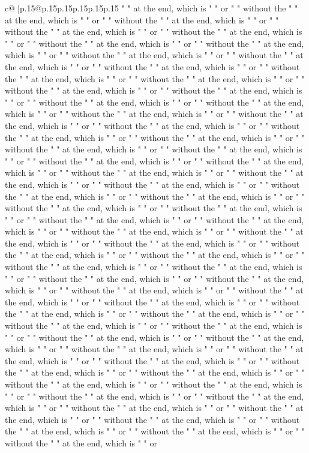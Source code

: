 \documentclass{article}
\begin{document}
{\begin{supertabular}{c@{$\;$}|p{.15\linewidth}@{}p{.15\linewidth}p{.15\linewidth}p{.15\linewidth}p{.15\linewidth}p{.15\linewidth}}
{{{" " at the end, which is " " or " " without the " " at the end, which is " " or " " without the " " at the end, which is " " or " " without the " " at the end, which is " " or " " without the " " at the end, which is " " or " " without the " " at the end, which is " " or " " without the " " at the end, which is " " or " " without the " " at the end, which is " " or " " without the " " at the end, which is " " or " " without the " " at the end, which is " " or " " without the " " at the end, which is " " or " " without the " " at the end, which is " " or " " without the " " at the end, which is " " or " " without the " " at the end, which is " " or " " without the " " at the end, which is " " or " " without the " " at the end, which is " " or " " without the " " at the end, which is " " or " " without the " " at the end, which is " " or " " without the " " at the end, which is " " or " " without the " " at the end, which is " " or " " without the " " at the end, which is " " or " " without the " " at the end, which is " " or " " without the " " at the end, which is " " or " " without the " " at the end, which is " " or " " without the " " at the end, which is " " or " " without the " " at the end, which is " " or " " without the " " at the end, which is " " or " " without the " " at the end, which is " " or " " without the " " at the end, which is " " or " " without the " " at the end, which is " " or " " without the " " at the end, which is " " or " " without the " " at the end, which is " " or " " without the " " at the end, which is " " or " " without the " " at the end, which is " " or " " without the " " at the end, which is " " or " " without the " " at the end, which is " " or " " without the " " at the end, which is " " or " " without the " " at the end, which is " " or " " without the " " at the end, which is " " or " " without the " " at the end, which is " " or " " without the " " at the end, which is " " or " " without the " " at the end, which is " " or " " without the " " at the end, which is " " or " " without the " " at the end, which is " " or " " without the " " at the end, which is " " or " " without the " " at the end, which is " " or " " without the " " at the end, which is " " or " " without the " " at the end, which is " " or " " without the " " at the end, which is " " or " " without the " " at the end, which is " " or " " without the " " at the end, which is " " or " " without the " " at the end, which is " " or " " without the " " at the end, which is " " or " " without the " " at the end, which is " " or " " without the " " at the end, which is " " or " " without the " " at the end, which is " " or " " without the " " at the end, which is " " or " " without the " " at the end, which is " " or " " without the " " at the end, which is " " or " " without the " " at the end, which is " " or " " without the " " at the end, which is " " or " " without the " " at the end, which is " " or " " without the " " at the end, which is " " or " " without the " " at the end, which is " " or " " without the " " at the end, which is " " or " " without the " " at the end, which is " " or " " without the " " at the end, which is " " or }}}
\end{supertabular}}
\end{document}
